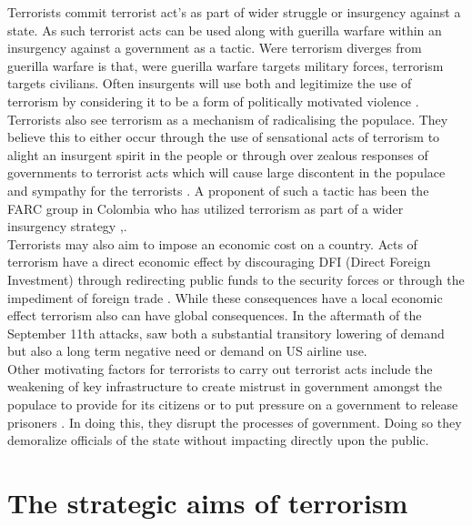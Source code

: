 Terrorists commit terrorist act's as part of wider struggle or insurgency against a state. As such terrorist acts can be used along with guerilla warfare within an insurgency against a government as a tactic. Were terrorism diverges from guerilla warfare is that, were guerilla warfare targets military forces, terrorism targets civilians. Often insurgents will use both and legitimize the use of terrorism by considering it to be a form of politically motivated violence \citep{ganor2002defining}. Terrorists also see terrorism as a mechanism of radicalising the populace. They believe this to either occur through the use of sensational acts of terrorism to alight an insurgent spirit in the people or through over zealous responses of governments to terrorist acts which will cause large discontent in the populace and sympathy for the terrorists \citep{jenkins1985international}. A proponent of such a tactic has been the FARC group in Colombia who has utilized terrorism as part of a wider insurgency strategy   \citep{wickham1990terror},\citep{marks2002colombian}.
\\
Terrorists may also aim to impose an economic cost on a country. Acts of terrorism have a direct economic effect by discouraging DFI (Direct Foreign Investment) through  redirecting public funds to the security forces or through the impediment of foreign trade \citep{sandler2008economic}. While these consequences have a local economic effect terrorism also can have global consequences. In the aftermath of the September 11th attacks, saw both a substantial transitory lowering of demand but also a long term negative need or demand \citep{ito2005assessing} on US airline use.
\\
Other motivating factors for terrorists to carry out terrorist acts include the weakening of key infrastructure to create mistrust in government amongst the populace to provide for its citizens or to put pressure on a government to release prisoners  \citep{TerrorismTypes2016}. In doing this, they disrupt the processes of government. Doing so they demoralize officials of the state without impacting directly upon the public. 

\section{The strategic aims of terrorism}
\label{sec:chap1strataimsterr}

